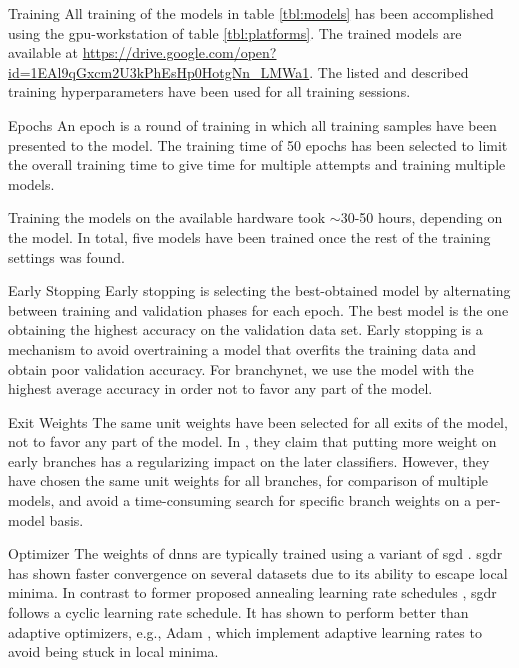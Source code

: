 \begin{enumdescript}
	\item[Training] All training of the models in table \ref{tbl:models} has been accomplished using the \gls{gpu}-workstation of table \ref{tbl:platforms}. The trained models are available at {\color{sns-grey}\url{https://drive.google.com/open?id=1EAl9qGxcm2U3kPhEsHp0HotgNn_LMWa1}}.
	The listed and described training hyperparameters have been used for all training sessions. 
	
	\begin{enumdescript}
		\item[Epochs] An epoch is a round of training in which all training samples have been presented to the model. The training time of 50 epochs has been selected to limit the overall training time to give time for multiple attempts and training multiple models.
		
		Training the models on the available hardware took $\sim$30-50 hours, depending on the model. In total, five models have been trained once the rest of the training settings was found.
		
		\item[Early Stopping] Early stopping is selecting the best-obtained model by alternating between training and validation phases for each epoch. The best model is the one obtaining the highest accuracy on the validation data set. Early stopping is a mechanism to avoid overtraining a model that overfits the training data and obtain poor validation accuracy. For \gls{branchynet}, we use the model with the highest average accuracy in order not to favor any part of the model.  
		
		\item[Exit Weights] The same unit weights have been selected for all exits of the model, not to favor any part of the model. In \cite{teerapittayanon_branchynet:_2016}, they claim that putting more weight on early branches has a regularizing impact on the later classifiers. However, they have chosen the same unit weights for all branches, for comparison of multiple models, and avoid a time-consuming search for specific branch weights on a per-model basis.
		
		\item[Optimizer] The weights of \gls{dnn}s are typically trained using a variant of \gls{sgd} \cite{goodfellow_deep_2016}. \gls{sgdr} \cite{loshchilov_sgdr:_2016} has shown faster convergence on several datasets due to its ability to escape local minima. In contrast to former proposed annealing learning rate schedules \cite{}, \gls{sgdr} follows a cyclic learning rate schedule. It has shown to perform better than adaptive optimizers, e.g., Adam \cite{kingma_adam:_2014}, which implement adaptive learning rates to avoid being stuck in local minima. 
		

\end{enumdescript}
\end{enumdescript}
